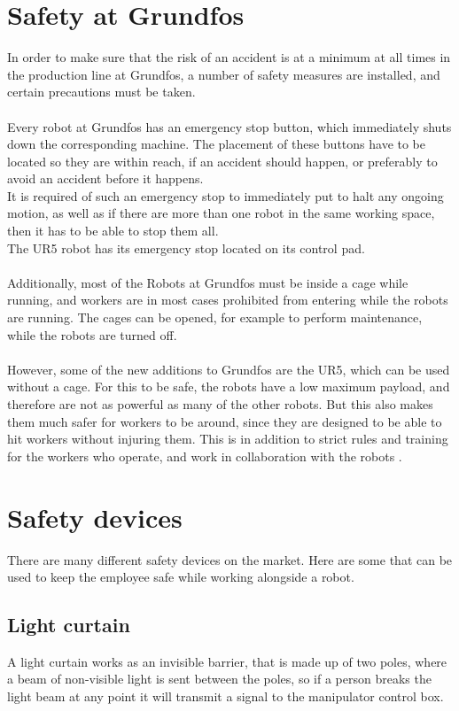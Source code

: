 \section{Safety at Grundfos}\label{ch:Safety at Grundfos}
In order to make sure that the risk of an accident is at a minimum at all times in the production line at Grundfos, a number of safety measures are installed, and certain precautions must be taken.\\
\\
Every robot at Grundfos has an emergency stop button, which immediately shuts down the corresponding machine. The placement of these buttons have to be located so they are within reach, if an accident should happen, or preferably to avoid an accident before it happens. \\
It is required of such an emergency stop to immediately put to halt any ongoing motion, as well as if there are more than one robot in the same working space, then it has to be able to stop them all.\\
The UR5 robot has its emergency stop located on its control pad.\\
\\
Additionally, most of the Robots at Grundfos must be inside a cage while running, and workers are in most cases prohibited from entering while the robots are running. The cages can be opened, for example to perform maintenance, while the robots are turned off.\\
\\
However, some of the new additions to Grundfos are the UR5, which can be used without a cage. For this to be safe, the robots have a low maximum payload, and therefore are not as powerful as many of the other robots. But this also makes them much safer for workers to be around, since they are designed to be able to hit workers without injuring them. This is in addition to strict rules and training for the workers who operate, and work in collaboration with the robots \cite{SafetyatGrundfos}. \\


\section{Safety devices}\label{SafetyDevices}
There are many different safety devices on the market. Here are some that can be used to keep the employee safe while working alongside a robot.\\

\subsection{Light curtain}
A light curtain works as an invisible barrier, that is made up of two poles, where a beam of non-visible light is sent between the poles, so if a person breaks the light beam at any point it will transmit a signal to the manipulator control box\cite{ligthcurtian}.\\

